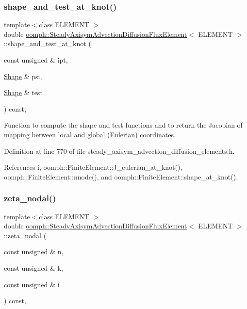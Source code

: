 \subsubsection{\texorpdfstring{shape\+\_\+and\+\_\+test\+\_\+at\+\_\+knot()}{shape\_and\_test\_at\_knot()}}
{\footnotesize\ttfamily template$<$class E\+L\+E\+M\+E\+NT $>$ \\
double \hyperlink{classoomph_1_1SteadyAxisymAdvectionDiffusionFluxElement}{oomph\+::\+Steady\+Axisym\+Advection\+Diffusion\+Flux\+Element}$<$ E\+L\+E\+M\+E\+NT $>$\+::shape\+\_\+and\+\_\+test\+\_\+at\+\_\+knot (\begin{DoxyParamCaption}\item[{const unsigned \&}]{ipt,  }\item[{\hyperlink{classoomph_1_1Shape}{Shape} \&}]{psi,  }\item[{\hyperlink{classoomph_1_1Shape}{Shape} \&}]{test }\end{DoxyParamCaption}) const\hspace{0.3cm}{\ttfamily [inline]}, {\ttfamily [protected]}}



Function to compute the shape and test functions and to return the Jacobian of mapping between local and global (Eulerian) coordinates. 



Definition at line 770 of file steady\+\_\+axisym\+\_\+advection\+\_\+diffusion\+\_\+elements.\+h.



References i, oomph\+::\+Finite\+Element\+::\+J\+\_\+eulerian\+\_\+at\+\_\+knot(), oomph\+::\+Finite\+Element\+::nnode(), and oomph\+::\+Finite\+Element\+::shape\+\_\+at\+\_\+knot().

\mbox{\label{classoomph_1_1SteadyAxisymAdvectionDiffusionFluxElement_a0aee153365d2f5e3cefac8b0ff38150b}} 
\subsubsection{\texorpdfstring{zeta\+\_\+nodal()}{zeta\_nodal()}}
{\footnotesize\ttfamily template$<$class E\+L\+E\+M\+E\+NT $>$ \\
double \hyperlink{classoomph_1_1SteadyAxisymAdvectionDiffusionFluxElement}{oomph\+::\+Steady\+Axisym\+Advection\+Diffusion\+Flux\+Element}$<$ E\+L\+E\+M\+E\+NT $>$\+::zeta\+\_\+nodal (\begin{DoxyParamCaption}\item[{const unsigned \&}]{n,  }\item[{const unsigned \&}]{k,  }\item[{const unsigned \&}]{i }\end{DoxyParamCaption}) const\hspace{0.3cm}{\ttfamily [inline]}, {\ttfamily [virtual]}}



